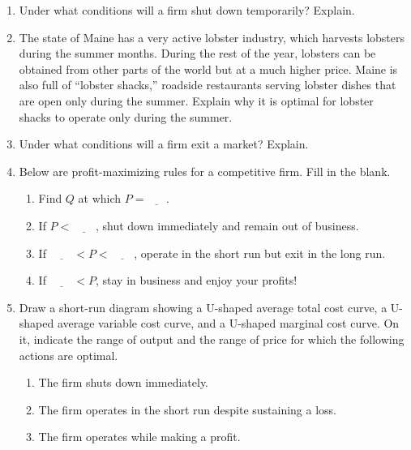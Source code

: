 \documentclass{article}
\begin{document}
\begin{enumerate}

\item Under what conditions will a firm shut down temporarily? Explain.

\item The state of Maine has a very active lobster industry, which harvests lobsters during the summer months. During the rest of the year, lobsters can be obtained from other parts of the world but at a much higher price. Maine is also full of “lobster shacks,” roadside restaurants serving lobster dishes that are open only during the summer. Explain why it is optimal for lobster shacks to operate only during the summer.

\item Under what conditions will a firm exit a market? Explain.

\item Below are profit-maximizing rules for a competitive firm. Fill in the blank.

	\begin{enumerate}
	
	\item Find $Q$ at which $P = \underline{\phantom{MC}}$.
	
	\item If $P < \underline{\phantom{AVC}}$, shut down immediately and remain out of business.
	
	\item If $\underline{\phantom{AVC}} < P < \underline{\phantom{ATC}}$, operate in the short run but exit in the long run.
	
	\item If $\underline{\phantom{ATC}} < P$, stay in business and enjoy your profits!
	
	\end{enumerate}

\item Draw a short-run diagram showing a U-shaped average total cost curve, a U-shaped average variable cost curve, and a U-shaped marginal cost curve. On it, indicate the range of output and the range of price for which the following actions are optimal.

	\begin{enumerate}
	
	\item The firm shuts down immediately.
	
	\item The firm operates in the short run despite sustaining a loss.
	
	\item The firm operates while making a profit. 
	
	\end{enumerate}

\end{enumerate}
\end{document}
